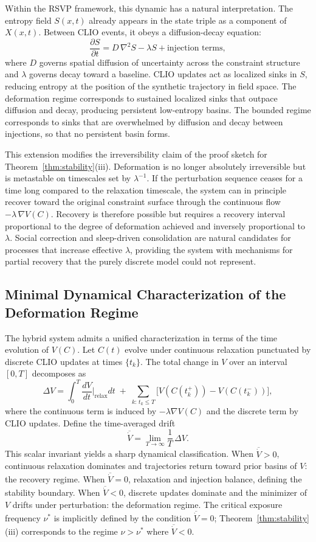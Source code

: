\documentclass[12pt, a4paper]{article}
\begin{document}
Within the RSVP framework, this dynamic has a natural interpretation. The entropy field $S(x,t)$ already appears in the state triple as a component of $X(x,t)$. Between CLIO events, it obeys a diffusion-decay equation:
\[
\frac{\partial S}{\partial t} = D\,\nabla^2 S - \lambda S + \text{injection terms},
\]
where $D$ governs spatial diffusion of uncertainty across the constraint structure and $\lambda$ governs decay toward a baseline. CLIO updates act as localized sinks in $S$, reducing entropy at the position of the synthetic trajectory in field space. The deformation regime corresponds to sustained localized sinks that outpace diffusion and decay, producing persistent low-entropy basins. The bounded regime corresponds to sinks that are overwhelmed by diffusion and decay between injections, so that no persistent basin forms.

This extension modifies the irreversibility claim of the proof sketch for Theorem~\ref{thm:stability}(iii). Deformation is no longer absolutely irreversible but is metastable on timescales set by $\lambda^{-1}$. If the perturbation sequence ceases for a time long compared to the relaxation timescale, the system can in principle recover toward the original constraint surface through the continuous flow $-\lambda\,\nabla V(C)$. Recovery is therefore possible but requires a recovery interval proportional to the degree of deformation achieved and inversely proportional to $\lambda$. Social correction and sleep-driven consolidation are natural candidates for processes that increase effective $\lambda$, providing the system with mechanisms for partial recovery that the purely discrete model could not represent.

\subsection{Minimal Dynamical Characterization of the Deformation Regime}

The hybrid system admits a unified characterization in terms of the time evolution of $V(C)$. Let $C(t)$ evolve under continuous relaxation punctuated by discrete CLIO updates at times $\{t_k\}$. The total change in $V$ over an interval $[0,T]$ decomposes as
\[
\Delta V = \int_0^T \frac{dV}{dt}\bigg|_{\mathrm{relax}} dt \;+\; \sum_{k:\, t_k \leq T} \bigl[V(C(t_k^+)) - V(C(t_k^-))\bigr],
\]
where the continuous term is induced by $-\lambda\nabla V(C)$ and the discrete term by CLIO updates. Define the time-averaged drift
\[
\overline{\dot{V}} = \lim_{T\to\infty} \frac{1}{T}\,\Delta V.
\]
This scalar invariant yields a sharp dynamical classification. When $\overline{\dot{V}} > 0$, continuous relaxation dominates and trajectories return toward prior basins of $V$: the recovery regime. When $\overline{\dot{V}} = 0$, relaxation and injection balance, defining the stability boundary. When $\overline{\dot{V}} < 0$, discrete updates dominate and the minimizer of $V$ drifts under perturbation: the deformation regime. The critical exposure frequency $\nu^*$ is implicitly defined by the condition $\overline{\dot{V}} = 0$; Theorem~\ref{thm:stability}(iii) corresponds to the regime $\nu > \nu^*$ where $\overline{\dot{V}} < 0$.
\end{document}

